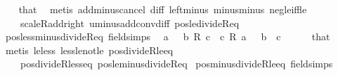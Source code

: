 \begin{isabellebody}
%
\isadelimproof
\ \ %
\endisadelimproof
%
\isatagproof
{}\isamarkupfalse%
\ that\ \isamarkupfalse%
\ {\isacharparenleft}{\kern0pt}metis\ add{\isacharunderscore}{\kern0pt}minus{\isacharunderscore}{\kern0pt}cancel\ diff{\isacharunderscore}{\kern0pt}{}\ left{\isacharunderscore}{\kern0pt}minus\ minus{\isacharunderscore}{\kern0pt}minus\ neg{\isacharunderscore}{\kern0pt}le{\isacharunderscore}{\kern0pt}iff{\isacharunderscore}{\kern0pt}le\isanewline
\ \ \ \ scaleR{\isacharunderscore}{\kern0pt}add{\isacharunderscore}{\kern0pt}right\ uminus{\isacharunderscore}{\kern0pt}add{\isacharunderscore}{\kern0pt}conv{\isacharunderscore}{\kern0pt}diff\ pos{\isacharunderscore}{\kern0pt}le{\isacharunderscore}{\kern0pt}divideR{\isacharunderscore}{\kern0pt}eq{\isacharparenright}{\kern0pt}%
\endisatagproof
{\isafoldproof}%
%
\isadelimproof
\isanewline
%
\endisadelimproof
\ \ \isanewline
{}\isamarkupfalse%
\ pos{\isacharunderscore}{\kern0pt}less{\isacharunderscore}{\kern0pt}minus{\isacharunderscore}{\kern0pt}divideR{\isacharunderscore}{\kern0pt}eq\ {\isacharbrackleft}{\kern0pt}field{\isacharunderscore}{\kern0pt}simps{\isacharbrackright}{\kern0pt}{\isacharcolon}{\kern0pt}\isanewline
\ \ {\isachardoublequoteopen}a\ {\isacharless}{\kern0pt}\ {\isacharminus}{\kern0pt}\ {\isacharparenleft}{\kern0pt}b\ {\isacharslash}{\kern0pt}\isactrlsub R\ c{\isacharparenright}{\kern0pt}\ {\isasymlongleftrightarrow}\ c\ {\isacharasterisk}{\kern0pt}\isactrlsub R\ a\ {\isacharless}{\kern0pt}\ {\isacharminus}{\kern0pt}\ b{\isachardoublequoteclose}\ \ {\isachardoublequoteopen}c\ {\isachargreater}{\kern0pt}\ {}{\isachardoublequoteclose}\isanewline
%
\isadelimproof
\ \ %
\endisadelimproof
%
\isatagproof
{}\isamarkupfalse%
\ that\ \isamarkupfalse%
\ {\isacharparenleft}{\kern0pt}metis\ le{\isacharunderscore}{\kern0pt}less\ less{\isacharunderscore}{\kern0pt}le{\isacharunderscore}{\kern0pt}not{\isacharunderscore}{\kern0pt}le\ pos{\isacharunderscore}{\kern0pt}divideR{\isacharunderscore}{\kern0pt}le{\isacharunderscore}{\kern0pt}eq\isanewline
\ \ \ \ pos{\isacharunderscore}{\kern0pt}divideR{\isacharunderscore}{\kern0pt}less{\isacharunderscore}{\kern0pt}eq\ pos{\isacharunderscore}{\kern0pt}le{\isacharunderscore}{\kern0pt}minus{\isacharunderscore}{\kern0pt}divideR{\isacharunderscore}{\kern0pt}eq{\isacharparenright}{\kern0pt}%
\endisatagproof
{\isafoldproof}%
%
\isadelimproof
\isanewline
%
\endisadelimproof
\isanewline
{}\isamarkupfalse%
\ pos{\isacharunderscore}{\kern0pt}minus{\isacharunderscore}{\kern0pt}divideR{\isacharunderscore}{\kern0pt}le{\isacharunderscore}{\kern0pt}eq\ {\isacharbrackleft}{\kern0pt}field{\isacharunderscore}{\kern0pt}simps{\isacharbrackright}{\kern0pt}{\isacharcolon}{\kern0pt}\isanewline

\end{isabellebody}
